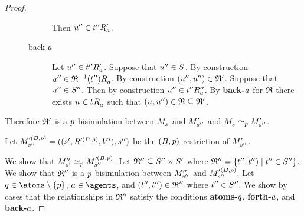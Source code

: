 \begin{proof}
\begin{description}
\begin{description}
                Then $\kStateUPP \in \kSuccessorsPA{\kStateTPP}$.
            \item[back-$\agentA$]
                Let $\kStateUPP \in \kSuccessorsPA{\kStateTPP}$.
                Suppose that $\kStateUPP \in \kStates$.
                By construction $\kStateUPP \in \kSuccessorsA{\refinement^{-1}(\kStateTPP)}$.
                By construction $(\kStateUPP, \kStateUPP) \in \bisimulation'$.
                Suppose that $\kStateUPP \in \kStatesPP$.
                Then by construction $\kStateUPP \in \kSuccessorsPPA{\kStateTPP}$.
                By {\bf back-$\agentA$} for $\refinement$ there exists $\kStateU \in \kSuccessorsA{\kStateT}$ such that $(\kStateU, \kStateUPP) \in \refinement \subseteq \bisimulation'$.
        \end{description}
\end{description}

Therefore $\bisimulation'$ is a $\atomP$-bisimulation between $\kPModel{\kStateS}$ and $\kPModelP{\kStateSPP}$ and $\kPModel{\kStateS} \bisimilar[\atomP] \kPModelP{\kStateSPP}$.

Let $\kPModel[\prime(\agentsB, \atomP)]{\kStateSPP} = ((\kStateSP, \kAccessibility[\prime(\agentsB, \atomP)]{}, \kValuationP), \kStateSPP)$ be the $(\agentsB, \atomP)$-restriction of $\kPModelP{\kStateSPP}$.

We show that $\kPModelPP{\kStateSP} \bisimilar[\atomP] \kPModel[\prime(\agentsB, \atomP)]{\kStateSPP}$.
Let $\bisimulation'' \subseteq \kStatesPP \times \kStatesP$ where $\bisimulation'' = \{\kStateTPP, \kStateTPP) \mid \kStateTPP \in \kStatesPP\}$.
We show that $\bisimulation''$ is a $\atomP$-bisimulation between $\kPModelPP{\kStateSPP}$ and $\kPModel[\prime(\agentsB, \atomP)]{\kStateSPP}$.
Let $\atomQ \in \atoms \setminus \{\atomP\}$, $\agentA \in \agents$, and $(\kStateTPP, \kStateTPP) \in \bisimulation''$ where $\kStateTPP \in \kStatesPP$.
We show by cases that the relationships in $\bisimulation''$ satisfy the conditions {\bf atoms-$\atomQ$}, {\bf forth-$\agentA$}, and {\bf back-$\agentA$}.


\end{proof}
